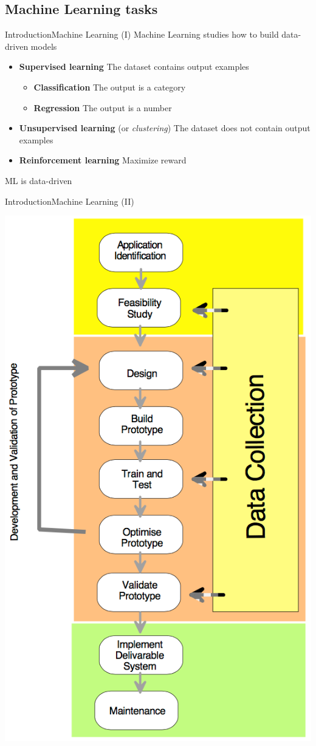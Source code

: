 \documentclass[10pt,compress]{beamer} %
\begin{document}
\subsection{Machine Learning tasks}
\begin{frame}{Introduction}{Machine Learning (I)}
	Machine Learning studies how to build data-driven models
	\begin{itemize}
	\item \textbf{Supervised learning} The dataset contains output examples
	\begin{flushleft}
		\begin{itemize}
		\item \textbf{Classification} The output is a category
		\item \textbf{Regression} The output is a number
		\end{itemize}
		\end{flushleft}
	\item \textbf{Unsupervised learning} (or \textit{clustering}) The dataset does not contain output examples
	\item \textbf{Reinforcement learning} Maximize reward
	\end{itemize}
	ML is data-driven
\end{frame}

\begin{frame}[plain]{Introduction}{Machine Learning (II)}
	\begin{center}
	\vspace{-0.3cm}
		\includegraphics[width=0.44\linewidth]{figs/lifecycle.png}
	\end{center}
\end{frame}
\end{document}
